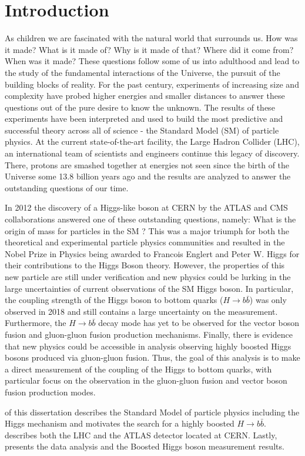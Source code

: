 \chapter{Introduction} \label{sec:intro}
As children we are fascinated with the natural world that surrounds us.  How
was it made? What is it made of?  Why is it made of that? Where did it come
from?  When was it made? These questions follow some of us into adulthood and
lead to the study of the fundamental interactions of the Universe, the pursuit
of the building blocks of reality.  For the past century, experiments of
increasing size and complexity have probed higher energies and smaller
distances to answer these questions out of the pure desire to know the unknown.
The results of these experiments have been interpreted and used to build the
most predictive and successful theory across all of science - the Standard
Model (SM) of particle physics. At the current state-of-the-art facility, the
Large Hadron Collider (LHC), an international team of scientists and engineers
continue this legacy of discovery.  There, protons are smashed together at
energies not seen since the birth of the Universe some 13.8 billion years ago
and the results are analyzed to answer the outstanding questions of our time.

In 2012 the discovery of a Higgs-like boson at CERN by the ATLAS and CMS
collaborations answered one of these outstanding questions, namely: What is the
origin of mass for particles in the SM \cite{Aad:2012tfa,Chatrchyan:2012xdj}?
This was a major triumph for both the theoretical and experimental particle
physics communities and resulted in the Nobel Prize in Physics being awarded to
Francois Englert and Peter W. Higgs for their contributions to the Higgs Boson
theory. However, the properties of this new particle are still under
verification and new physics could be lurking in the large uncertainties of
current observations of the SM Higgs boson.  In particular, the coupling
strength of the Higgs boson to bottom quarks ($H \rightarrow b\bar{b}$) was
only observed in 2018 and still contains a large uncertainty on the
measurement. Furthermore, the $H \rightarrow b\bar{b}$ decay mode has yet to be
observed for the vector boson fusion and gluon-gluon fusion production
mechanisms.  Finally, there is evidence that new physics could be accessible in
analysis observing highly boosted Higgs bosons produced via gluon-gluon fusion.
Thus, the goal of this analysis is to make a direct measurement of the coupling
of the Higgs to bottom quarks, with particular focus on the observation in the
gluon-gluon fusion and vector boson fusion production modes. 

 of this dissertation describes the Standard Model of
particle physics including the Higgs mechanism and motivates the search for a
highly boosted $H \rightarrow b\bar{b}$.  describes both
the LHC and the ATLAS detector located at CERN. Lastly, 
presents the data analysis and the Boosted Higgs boson measurement results.
